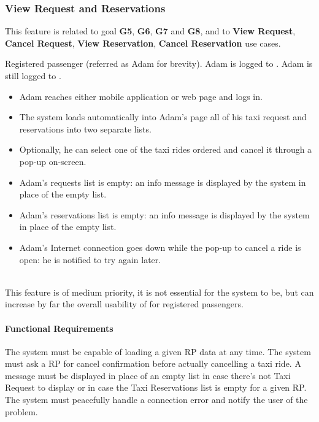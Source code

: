 \subsubsection{View Request and Reservations}
This feature is related to goal \textbf{G5}, \textbf{G6}, \textbf{G7} and \textbf{G8}, and to \textbf{View Request}, \textbf{Cancel Request}, \textbf{View Reservation}, \textbf{Cancel Reservation} use cases.
\begin{itemize}
	 Registered passenger (referred as Adam for brevity).
	 Adam is logged to \myTaxiService{}.
	 Adam is still logged to \myTaxiService{}.
	\begin{itemize}
		\item Adam reaches either \myTaxiService{} mobile application or web page and logs in.
		\item The system loads automatically into Adam's page all of his taxi request and reservations into two separate lists.
		\item Optionally, he can select one of the taxi rides ordered and cancel it through a pop-up on-screen.
	\end{itemize}
	\begin{itemize}
		\item Adam's requests list is empty: an info message is displayed by the system in place of the empty list.
		\item Adam's reservations list is empty: an info message is displayed by the system in place of the empty list.
		\item Adam's Internet connection goes down while the pop-up to cancel a ride is open: he is notified to try again later.
	\end{itemize}
\end{itemize}
\\
This feature is of medium priority, it is not essential for the system to be, but can increase by far the overall usability of \myTaxiService{} for registered passengers.\par
\paragraph{Functional Requirements}
\begin{itemize}
	 The system must be capable of loading a given RP data at any time.
	 The system must ask a RP for cancel confirmation before actually cancelling a taxi ride.
	 A message must be displayed in place of an empty list in case there's not Taxi Request to display or in case the Taxi Reservations list is empty for a given RP.
	 The system must peacefully handle a connection error and notify the user of the problem.
\end{itemize}

